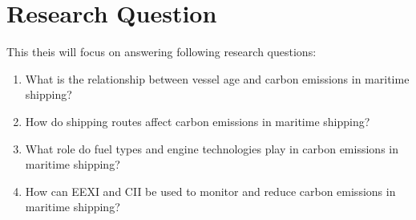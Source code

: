 \section{Research Question}

This theis will focus on answering following research questions:

\begin{enumerate}
    \item What is the relationship between vessel age and carbon emissions in maritime shipping?
    \item How do shipping routes affect carbon emissions in maritime shipping?
    \item What role do fuel types and engine technologies play in carbon emissions in maritime shipping?
    \item How can EEXI and CII be used to monitor and reduce carbon emissions in maritime shipping?
\end{enumerate}